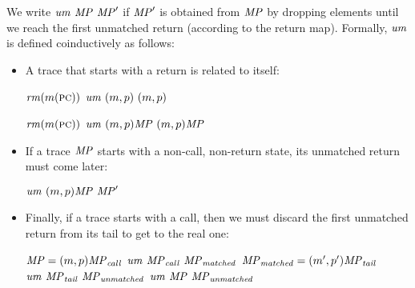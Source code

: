 \documentclass[acmsmall,review,anonymous]{acmart}\settopmatter{printfolios=true,printccs=false,printacmref=false}
\begin{document}
{
We write $\mathit{um}~\mathit{MP}~\mathit{MP}'$ if $\mathit{MP}'$ is
obtained from $\mathit{MP}$ by dropping elements until we reach the first unmatched return
(according to the return map).  Formally, $\mathit{um}$ is defined coinductively as follows:
\begin{itemize}
\item A trace that starts with a return is related to itself:

\begin{center}
\begin{minipage}{.3\textwidth}
  \judgmenttwo{\(\callmap(\mach(\PCname)) = \bot\)}
              {\(\mathit{rm}(m(\textsc{pc}))\)}
              {\(\mathit{um} ~ (m,p) ~ (m,p)\)}
\end{minipage}
\hspace*{0.1\textwidth}
\begin{minipage}{.3\textwidth}
  \judgmenttwo{\(\callmap(\mach(\PCname)) = \bot\)}
              {\(\mathit{rm}(m(\textsc{pc}))\)}
              {\(\mathit{um} ~ (m,p)\mathit{MP} ~ (m,p)\mathit{MP}\)}
\end{minipage}
\end{center}

\item If a trace \(\mathit{MP}\) starts with a non-call, non-return state,
  its unmatched return must come later:

           {\(\mathit{um} ~ (m,p)\mathit{MP} ~ \mathit{MP}'\)}

\item Finally, if a trace starts with a call, then we must discard the first
  unmatched return from its tail to get to the real one:


             {\(\mathit{MP} = (m,p)\mathit{MP}_{\mathit{call}}\) \quad \(\mathit{um} ~ \mathit{MP}_{\mathit{call}} ~ \mathit{MP}_{\mathit{matched}}\)}
             {\(\mathit{MP}_{\mathit{matched}} = (m',p') \mathit{MP}_{\mathit{tail}}\) \quad
              \(\mathit{um} ~ \mathit{MP}_{\mathit{tail}} ~ \mathit{MP}_{\mathit{unmatched}}\)}
            {\(\mathit{um} ~ \mathit{MP} ~ \mathit{MP}_{\mathit{unmatched}}\)}
\end{itemize}
\ifspace
{}
\fi

}
\end{document}
